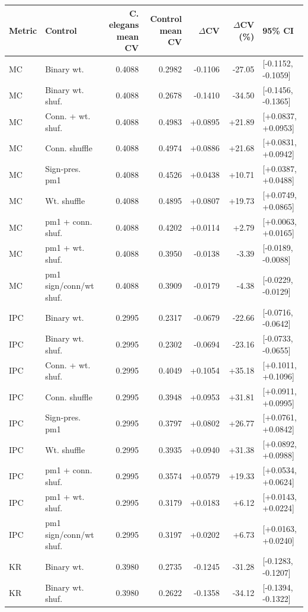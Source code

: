 \begin{tabular}{llrrrrl}
\toprule
Metric & Control & C. elegans mean CV & Control mean CV & $\Delta$CV & $\Delta$CV (\%) & 95\% CI \\
\midrule
MC & Binary wt. & 0.4088 & 0.2982 & -0.1106 & -27.05 & [-0.1152, -0.1059] \\
MC & Binary wt. shuf. & 0.4088 & 0.2678 & -0.1410 & -34.50 & [-0.1456, -0.1365] \\
MC & Conn. + wt. shuf. & 0.4088 & 0.4983 & +0.0895 & +21.89 & [+0.0837, +0.0953] \\
MC & Conn. shuffle & 0.4088 & 0.4974 & +0.0886 & +21.68 & [+0.0831, +0.0942] \\
MC & Sign-pres. pm1 & 0.4088 & 0.4526 & +0.0438 & +10.71 & [+0.0387, +0.0488] \\
MC & Wt. shuffle & 0.4088 & 0.4895 & +0.0807 & +19.73 & [+0.0749, +0.0865] \\
MC & pm1 + conn. shuf. & 0.4088 & 0.4202 & +0.0114 & +2.79 & [+0.0063, +0.0165] \\
MC & pm1 + wt. shuf. & 0.4088 & 0.3950 & -0.0138 & -3.39 & [-0.0189, -0.0088] \\
MC & pm1 sign/conn/wt shuf. & 0.4088 & 0.3909 & -0.0179 & -4.38 & [-0.0229, -0.0129] \\
IPC & Binary wt. & 0.2995 & 0.2317 & -0.0679 & -22.66 & [-0.0716, -0.0642] \\
IPC & Binary wt. shuf. & 0.2995 & 0.2302 & -0.0694 & -23.16 & [-0.0733, -0.0655] \\
IPC & Conn. + wt. shuf. & 0.2995 & 0.4049 & +0.1054 & +35.18 & [+0.1011, +0.1096] \\
IPC & Conn. shuffle & 0.2995 & 0.3948 & +0.0953 & +31.81 & [+0.0911, +0.0995] \\
IPC & Sign-pres. pm1 & 0.2995 & 0.3797 & +0.0802 & +26.77 & [+0.0761, +0.0842] \\
IPC & Wt. shuffle & 0.2995 & 0.3935 & +0.0940 & +31.38 & [+0.0892, +0.0988] \\
IPC & pm1 + conn. shuf. & 0.2995 & 0.3574 & +0.0579 & +19.33 & [+0.0534, +0.0624] \\
IPC & pm1 + wt. shuf. & 0.2995 & 0.3179 & +0.0183 & +6.12 & [+0.0143, +0.0224] \\
IPC & pm1 sign/conn/wt shuf. & 0.2995 & 0.3197 & +0.0202 & +6.73 & [+0.0163, +0.0240] \\
KR & Binary wt. & 0.3980 & 0.2735 & -0.1245 & -31.28 & [-0.1283, -0.1207] \\
KR & Binary wt. shuf. & 0.3980 & 0.2622 & -0.1358 & -34.12 & [-0.1394, -0.1322] \\

\end{tabular}
